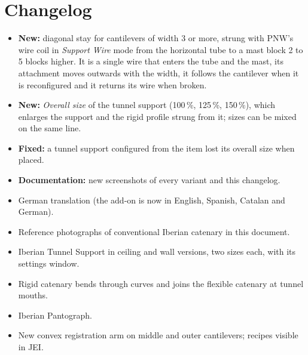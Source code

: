 \documentclass[11pt,a4paper]{article}
\begin{document}
\section*{Changelog}

\begin{small}
\begin{description}[style=nextline,leftmargin=0pt]
  \item[8 October 2026]
  \begin{itemize}
    \item \textbf{New:} diagonal stay for cantilevers of width 3 or more, strung with PNW's wire coil in
          \emph{Support Wire} mode from the horizontal tube to a mast block 2 to 5 blocks higher. It is a single
          wire that enters the tube and the mast, its attachment moves outwards with the width, it follows the
          cantilever when it is reconfigured and it returns its wire when broken.
    \item \textbf{New:} \emph{Overall size} of the tunnel support (100\,\%, 125\,\%, 150\,\%), which enlarges the
          support and the rigid profile strung from it; sizes can be mixed on the same line.
    \item \textbf{Fixed:} a tunnel support configured from the item lost its overall size when placed.
    \item \textbf{Documentation:} new screenshots of every variant and this changelog.
  \end{itemize}
  \item[4 October 2026]
  \begin{itemize}
    \item German translation (the add-on is now in English, Spanish, Catalan and German).
    \item Reference photographs of conventional Iberian catenary in this document.
  \end{itemize}
  \item[3 October 2026]
  \begin{itemize}
    \item Iberian Tunnel Support in ceiling and wall versions, two sizes each, with its settings window.
    \item Rigid catenary bends through curves and joins the flexible catenary at tunnel mouths.
    \item Iberian Pantograph.
    \item New convex registration arm on middle and outer cantilevers; recipes visible in JEI.

\end{itemize}
\end{description}
\end{small}
\end{document}
